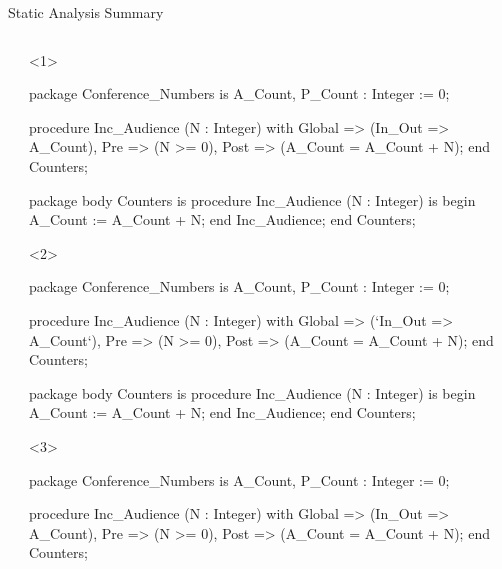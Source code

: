\documentclass{beamer}
\begin{document}
\begin{frame}[fragile]{Static Analysis Summary}
\begin{columns}
\begin{column}{2cm}
    \end{column}

    \begin{column}{9cm}

      \begin{onlyenv}<1>
      \begin{pxcode}[language=SPARK,style=magic,gobble=8]
        package Conference_Numbers
        is
           A_Count, P_Count : Integer := 0;

           procedure Inc_Audience (N : Integer)
           with Global => (In_Out => A_Count),
                Pre    => (N >= 0),
                Post   => (A_Count = A_Count + N);
        end Counters;

        package body Counters
        is
           procedure Inc_Audience (N : Integer)
           is
           begin
              A_Count := A_Count + N;
           end Inc_Audience;
        end Counters;
      \end{pxcode}
      \end{onlyenv}

      \begin{onlyenv}<2>
      \begin{pxcode}[language=SPARK,style=magic,gobble=8]
        package Conference_Numbers
        is
           A_Count, P_Count : Integer := 0;

           procedure Inc_Audience (N : Integer)
           with Global => (`In_Out => A_Count`),
                Pre    => (N >= 0),
                Post   => (A_Count = A_Count + N);
        end Counters;

        package body Counters
        is
           procedure Inc_Audience (N : Integer)
           is
           begin
              A_Count := A_Count + N;
           end Inc_Audience;
        end Counters;
      \end{pxcode}
      \end{onlyenv}

      \begin{onlyenv}<3>
      \begin{pxcode}[language=SPARK,style=magic,gobble=8]
        package Conference_Numbers
        is
           A_Count, P_Count : Integer := 0;

           procedure Inc_Audience (N : Integer)
           with Global => (In_Out => A_Count),
                Pre    => (N >= 0),
                Post   => (A_Count = A_Count + N);
        end Counters;


\end{pxcode}
\end{onlyenv}
\end{column}
\end{columns}
\end{frame}
\end{document}
